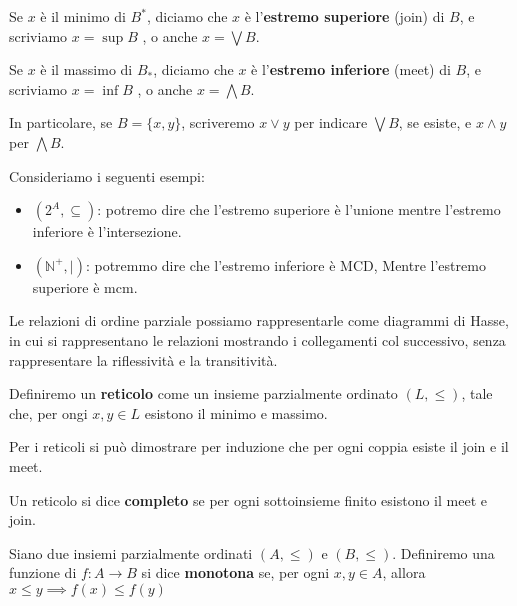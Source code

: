 \begin{definizione}
    Se $x$ è il minimo di $B^\ast$, diciamo che $x$ è l'\textbf{estremo superiore}
    (join) di $B$, e scriviamo $x=\sup B$ , o anche $x=\bigvee B$.

    Se $x$ è il massimo di $B_\ast$, diciamo che $x$ è l'\textbf{estremo inferiore}
    (meet) di $B$, e scriviamo $x=\inf B$ , o anche $x=\bigwedge B$.

    In particolare, se $B = \{x, y\}$, scriveremo $x \lor y$ per indicare $\bigvee B$,
    se esiste, e $x \land y$ per $\bigwedge B$.
\end{definizione}

\begin{esempio} 
    Consideriamo i seguenti esempi:
    \begin{itemize}
        \item $(2^A, \subseteq)$: potremo dire che l'estremo superiore è l'unione
        mentre l'estremo inferiore è l'intersezione.
        \item $(\mathbb{N}^+,|)$: potremmo dire che l'estremo inferiore è MCD, Mentre
        l'estremo superiore è mcm.
    \end{itemize}
\end{esempio}

Le relazioni di ordine parziale possiamo rappresentarle come diagrammi di Hasse,
in cui si rappresentano le relazioni mostrando i collegamenti col successivo, senza
rappresentare la riflessività e la transitività.

\begin{definizione}
    Definiremo un \textbf{reticolo}  come un insieme parzialmente ordinato $(L,\le)$,
    tale che, per ongi $x,y\in L$ esistono il minimo e massimo.
\end{definizione}

Per i reticoli si può dimostrare per induzione che per ogni coppia esiste il join
e il meet.

\begin{definizione}
    Un reticolo si dice \textbf{completo} se per ogni sottoinsieme finito esistono
    il meet e join. 
\end{definizione}

\begin{definizione}
    Siano due insiemi parzialmente ordinati $(A,\le)$ e $(B,\le)$. Definiremo una
    funzione di $f:A\to B$ si dice \textbf{monotona} se, per ogni $x,y\in A$, allora
    $x\le y\implies f(x)\le f(y)$
\end{definizione}

